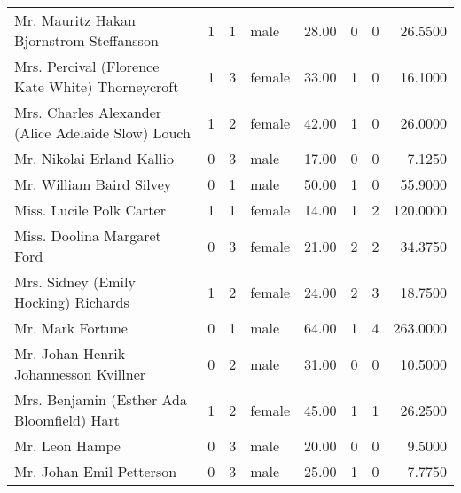 \begin{tabular}{lrrlrrrr}
Mr. Mauritz Hakan Bjornstrom-Steffansson           &         1 &       1 &    male &  28.00 &                        0 &                        0 &   26.5500 \\
Mrs. Percival (Florence Kate White) Thorneycroft   &         1 &       3 &  female &  33.00 &                        1 &                        0 &   16.1000 \\
Mrs. Charles Alexander (Alice Adelaide Slow) Louch &         1 &       2 &  female &  42.00 &                        1 &                        0 &   26.0000 \\
Mr. Nikolai Erland Kallio                          &         0 &       3 &    male &  17.00 &                        0 &                        0 &    7.1250 \\
Mr. William Baird Silvey                           &         0 &       1 &    male &  50.00 &                        1 &                        0 &   55.9000 \\
Miss. Lucile Polk Carter                           &         1 &       1 &  female &  14.00 &                        1 &                        2 &  120.0000 \\
Miss. Doolina Margaret Ford                        &         0 &       3 &  female &  21.00 &                        2 &                        2 &   34.3750 \\
Mrs. Sidney (Emily Hocking) Richards               &         1 &       2 &  female &  24.00 &                        2 &                        3 &   18.7500 \\
Mr. Mark Fortune                                   &         0 &       1 &    male &  64.00 &                        1 &                        4 &  263.0000 \\
Mr. Johan Henrik Johannesson Kvillner              &         0 &       2 &    male &  31.00 &                        0 &                        0 &   10.5000 \\
Mrs. Benjamin (Esther Ada Bloomfield) Hart         &         1 &       2 &  female &  45.00 &                        1 &                        1 &   26.2500 \\
Mr. Leon Hampe                                     &         0 &       3 &    male &  20.00 &                        0 &                        0 &    9.5000 \\
Mr. Johan Emil Petterson                           &         0 &       3 &    male &  25.00 &                        1 &                        0 &    7.7750 \\

\end{tabular}
